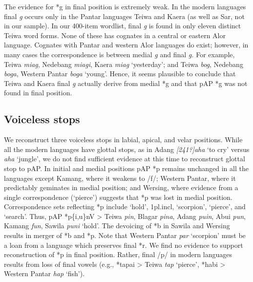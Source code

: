 The evidence for *g in final position is extremely weak. In the modern languages final \textit{g} occurs only in the Pantar languages Teiwa and Kaera (as well as Sar, not in our sample). In our 400-item wordlist, final \textit{g} is found in only eleven distinct Teiwa word forms. None of these has cognates in a central or eastern Alor language. Cognates with Pantar and western Alor languages do exist; however, in many cases the correspondence is between medial \textit{g }and final \textit{g.} For example, Teiwa \textit{mia{\textlengthmark}g}, Nedebang \textit{mia{\textlengthmark}gi}, Kaera \textit{miag} `yesterday'; and Teiwa \textit{bog}, Nedebang \textit{boga}, Western Pantar \textit{bog{\textlengthmark}a} `young'. Hence, it seems plausible to conclude that Teiwa and Kaera final \textit{g} actually derive from medial *g and that pAP *g was not found in final position.

\subsection{ Voiceless stops}
We reconstruct three voiceless stops in labial, apical, and velar positions. While all the modern languages have glottal stops, as in Adang \textit{[241?]aha{\textltailn}} `to cry' versus \textit{aha{\textltailn}} `jungle', we do not find sufficient evidence at this time to reconstruct glottal stop to pAP. In initial and medial positions pAP *p remains unchanged in all the languages except Kamang, where it weakens to /f/; Western Pantar, where it predictably geminates in medial position; and Wersing, where evidence from a single correspondence (`pierce') suggests that *p was lost in medial position. Correspondence sets reflecting *p include `hold', 1pl.incl, `scorpion', `pierce', and `search'. Thus, pAP *p\{i,u\}nV {\textgreater} Teiwa \textit{pin}, Blagar \textit{pina}, Adang \textit{puin}, Abui \textit{pun}, Kamang \textit{fun}, Sawila \textit{puni }`hold'. The devoicing of *b in Sawila and Wersing results in merger of *b and *p.  Note that Western Pantar \textit{par} `scorpion' must be a loan from a
language which preserves final *r. We find no evidence to support reconstruction of *p in final position. Rather, final /p/ in modern languages results from loss of final vowels (e.g., *tapai {\textgreater} Teiwa \textit{tap }`pierce', *habi {\textgreater} Western Pantar \textit{hap }`fish').

